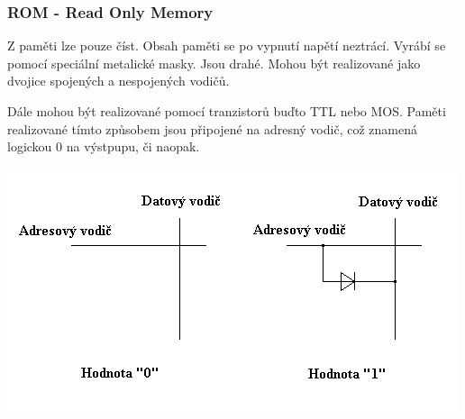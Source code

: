 \subsubsection{ROM - Read Only Memory}
\begin{multicols}{2}
    Z paměti lze pouze číst. 
    Obsah paměti se po vypnutí napětí neztrácí.
    Vyrábí se pomocí speciální metalické masky.
    Jsou drahé.
    Mohou být realizované jako dvojice spojených a nespojených vodičů.

    Dále mohou být realizované pomocí tranzistorů buďto TTL nebo MOS.
    Paměti realizované tímto způsobem jsou připojené na adresný vodič, což znamená logickou 0 na výstpupu, či naopak.
    \columnbreak
    
    \includegraphics[width=\linewidth]{TVY-POS/Polovodičové paměti/ROM.png}
\end{multicols}
